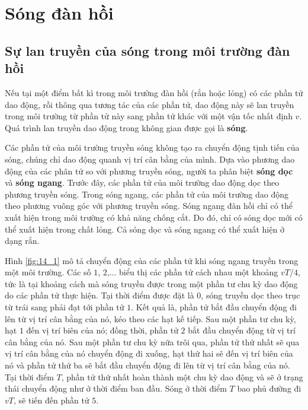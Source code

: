 

\chapter[SÓNG ĐÀN HỒI]{Sóng đàn hồi}\label{chap:14}

\section{Sự lan truyền của sóng trong môi trường đàn hồi}\label{sec:14_1}

Nếu tại một điểm bất kì trong môi trường đàn hồi (rắn hoặc lỏng) có các phần tử dao động, rồi thông qua tương tác của các phần tử, dao động này sẽ lan truyền trong môi trường từ phần tử này sang phần tử khác với một vận tốc nhất định $v$. Quá trình lan truyền dao động trong không gian được gọi là \textbf{sóng}.

Các phần tử của môi trường truyền sóng không tạo ra chuyển động tịnh tiến của sóng, chúng chỉ dao động quanh vị trí cân bằng của mình. Dựa vào phương dao động của các phân tử so với phương truyền sóng, người ta phân biệt \textbf{sóng dọc} và \textbf{sóng ngang}. Trước đây, các phần tử của môi trường dao động dọc theo phương truyền sóng. Trong sóng ngang, các phần tử của môi trường dao động theo phương vuông góc với phương truyền sóng. Sóng ngang đàn hồi chỉ có thể xuất hiện trong môi trường có khả năng chống cắt. Do đó, chỉ có sóng dọc mới có thể xuất hiện trong chất lỏng. Cả sóng dọc và sóng ngang có thể xuất hiện ở dạng rắn.

Hình \ref{fig:14_1} mô tả chuyển động của các phần tử khi sóng ngang truyền trong một môi trường. Các số $1$, $2$,... biểu thị các phần tử cách nhau một khoảng $vT/4$, tức là tại khoảng cách mà sóng truyền được trong một phần tư chu kỳ dao động do các phần tử thực hiện. Tại thời điểm được đặt là $0$, sóng truyền dọc theo trục từ trái sang phải đạt tới phần tử $1$. Kết quả là, phần tử bắt đầu chuyển động đi lên từ vị trí cân bằng của nó, kéo theo các hạt kế tiếp. Sau một phần tư chu kỳ, hạt $1$ đến vị trí biên của nó; đồng thời, phần tử $2$ bắt đầu chuyển động từ vị trí cân bằng của nó. Sau một phần tư chu kỳ nữa trôi qua, phần tử thứ nhất sẽ qua vị trí cân bằng của nó chuyển động đi xuống, hạt thứ hai sẽ đến vị trí biên của nó và phần tử thứ ba sẽ bắt đầu chuyển động đi lên từ vị trí cân bằng của nó. Tại thời điểm $T$, phần tử thứ nhất hoàn thành một chu kỳ dao động và sẽ ở trạng thái chuyển động như ở thời điểm ban đầu. Sóng ở thời điểm $T$ bao phủ đường đi $vT$, sẽ tiến đến phần tử $5$.

